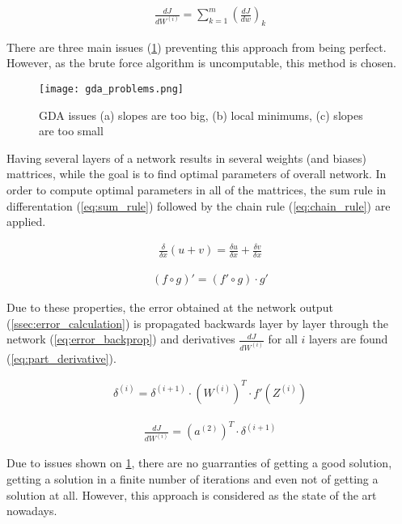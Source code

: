\begin{align} \label{eq:batch_gd}
\frac{dJ}{dW^{(i)}} =  \displaystyle{\sum_{k=1}^m} (\frac{dJ}{dw})_k
\end{align}

There are three main issues (\cref{img:gda_problems}) preventing this approach from being perfect. However, as the brute force algorithm is uncomputable, this method is chosen.

\begin{figure}[H]
  \centering
  \texttt{[image: gda\_problems.png]}
  \caption{GDA issues \citep{online:nn_demystified} (a) slopes are too big, (b) local minimums, (c) slopes are too small}
  \label{img:gda_problems}
\end{figure}


Having several layers of a network results in several weights (and biases) mattrices, while the goal is to find optimal parameters of overall network. In order to compute optimal parameters in all of the mattrices, the sum rule in differentation (\cref{eq:sum_rule}) followed by the chain rule (\cref{eq:chain_rule}) are applied.

\begin{align} \label{eq:sum_rule}
\frac{\delta}{\delta x} (u+v) = \frac{\delta u}{\delta x} + \frac{\delta v}{\delta x}
\end{align}

\begin{align} \label{eq:chain_rule}
(f \circ g)' = (f' \circ g) \cdot g'
\end{align}

Due to these properties, the error obtained at the network output (\cref{ssec:error_calculation}) is propagated backwards layer by layer through the network (\cref{eq:error_backprop}) and derivatives $ \frac{dJ}{dW^{(i)}} $ for all $ i $ layers are found (\cref{eq:part_derivative}).

\begin{align} \label{eq:error_backprop}
\delta^{(i)} = \delta^{(i+1)} \cdot (W^{(i)})^T \cdot f'(Z^{(i)})
\end{align}

\begin{align} \label{eq:part_derivative}
\frac{dJ}{dW^{(i)}} = (a^{(2)})^T \cdot \delta^{(i+1)}
\end{align}

Due to issues shown on \cref{img:gda_problems}, there are no guarranties of getting a good solution, getting a solution in a finite number of iterations and even not of getting a solution at all. However, this approach is considered as the state of the art nowadays.

